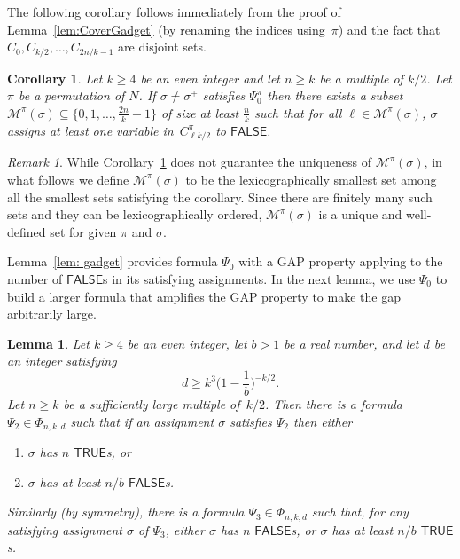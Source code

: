 \documentclass[11pt]{article}
\newtheorem{corollary}[theorem]{Corollary}
\newtheorem{lemma}[theorem]{Lemma}
\theoremstyle{definition}
\theoremstyle{remark}
\newtheorem*{remark}{Remark}
\def\TRUE{\mathsf{TRUE}}
\def\FALSE{\mathsf{FALSE}}
\begin{document}
The following corollary follows immediately from the proof of Lemma~\ref{lem:CoverGadget} (by renaming the indices using~$\pi$)
and the fact that $C_{0}, C_{k/2}, \dots, C_{2n/k-1}$ are disjoint sets.


  
\begin{corollary}\label{cor:CoverGadget}
Let $k\ge 4$ be an even integer and let $n\geq k$ be a multiple of $k/2$. 
Let $\pi$ be a permutation of $N$. 
If $\sigma \neq \sigma^+$ satisfies $\Psi_0^\pi$
then there exists a subset $\mathcal{M}^\pi(\sigma)\subseteq \{0,1,\dots, \frac{2n}{k}-1\}$ of size at least $\frac{n}{k}$ such that 
for all $\ell \in \mathcal{M}^\pi(\sigma)$, $\sigma$ assigns at least one variable in~$C^\pi_{\ell k/2}$ to $\FALSE$.
\end{corollary}
\begin{remark}
 While Corollary~\ref{cor:CoverGadget} does not guarantee the uniqueness of $\mathcal{M}^\pi(\sigma)$, in what follows we define $\mathcal{M}^\pi(\sigma)$ to be the lexicographically smallest set among all the smallest sets satisfying the corollary. Since there are finitely many such sets and they can be lexicographically ordered, $\mathcal{M}^\pi(\sigma)$ is a unique and well-defined set for given $\pi$ and $\sigma$.
\end{remark}

 

Lemma~\ref{lem: gadget} provides formula $\Psi_0$   with a GAP property applying to the number of $\FALSE$s in  its satisfying assignments. 
In the next lemma, we use  $\Psi_0$  to build a larger formula that amplifies the GAP property to make the gap arbitrarily large.
\begin{lemma} 
    \label{lem: large gadget}
Let $k\ge 4$ be an even integer, let $b>1$ be a real number, and let 
$d$
be an integer satisfying
 \[d\ge k^3\big(1-\frac{1}{b}\big)^{-k/2}.\] 
Let $n\geq k$ be a sufficiently large multiple of~$k/2$.
Then there is a formula $\Psi_2\in\Phi_{n,k,d}$ such that if an assignment $\sigma$ satisfies $\Psi_2$ then  either 
    \begin{enumerate}
        \item $\sigma$ has $n$ $\TRUE$s, or
        \item $\sigma$ has at least $n/b$ $\FALSE$s.  
    \end{enumerate}
    Similarly (by symmetry), there is a formula $\Psi_3 \in \Phi_{n,k,d}$ such that, for any satisfying assignment $\sigma$ of $\Psi_3$, either   $\sigma$ has $n$  $\FALSE$s, or $\sigma$ has at least $n/b$  $\TRUE$s.   
\end{lemma}
 
\end{document}
